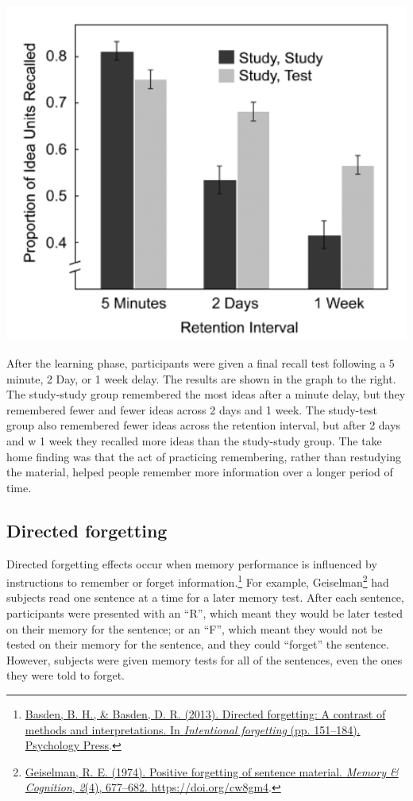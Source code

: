 \documentclass[
  oneside,
  12pt]{crumpbook}
\newenvironment{floatright50}{%
  \wrapfigure{R}{.5\textwidth}%
  }{%
  \endwrapfigure}
\begin{document}
\begin{floatright50}
\includegraphics[width=1\linewidth]{imgs/Test_enhanced}

\end{floatright50}

After the learning phase, participants were given a final recall test following a 5 minute, 2 Day, or 1 week delay. The results are shown in the graph to the right. The study-study group remembered the most ideas after a minute delay, but they remembered fewer and fewer ideas across 2 days and 1 week. The study-test group also remembered fewer ideas across the retention interval, but after 2 days and w 1 week they recalled more ideas than the study-study group. The take home finding was that the act of practicing remembering, rather than restudying the material, helped people remember more information over a longer period of time.

\hypertarget{directed-forgetting}{%
\subsection{Directed forgetting}\label{directed-forgetting}}

Directed forgetting effects occur when memory performance is influenced by instructions to remember or forget information.\footnote{\protect\hyperlink{ref-basdenDirectedForgettingContrast2013}{Basden, B. H., \& Basden, D. R. (2013). Directed forgetting: {A} contrast of methods and interpretations. In \emph{Intentional forgetting} (pp. 151--184). {Psychology Press}}.} For example, Geiselman\footnote{\protect\hyperlink{ref-geiselmanPositiveForgettingSentence1974}{Geiselman, R. E. (1974). Positive forgetting of sentence material. \emph{Memory \& Cognition}, \emph{2}(4), 677--682. \url{https://doi.org/cw8gm4}}.} had subjects read one sentence at a time for a later memory test. After each sentence, participants were presented with an ``R'', which meant they would be later tested on their memory for the sentence; or an ``F'', which meant they would not be tested on their memory for the sentence, and they could ``forget'' the sentence. However, subjects were given memory tests for all of the sentences, even the ones they were told to forget.
\end{document}
